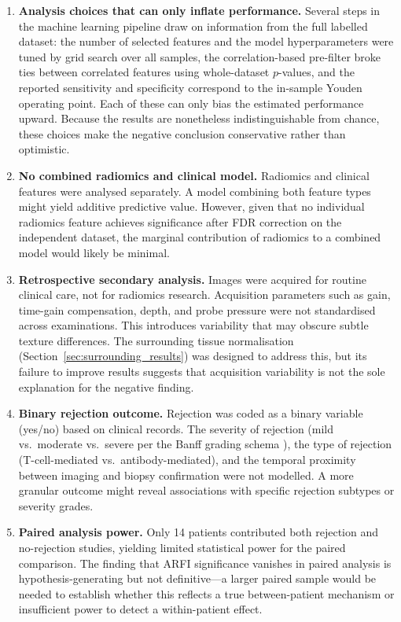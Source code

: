 \begin{enumerate}
\item \textbf{Analysis choices that can only inflate performance.} Several steps in the machine learning pipeline draw on information from the full labelled dataset: the number of selected features and the model hyperparameters were tuned by grid search over all samples, the correlation-based pre-filter broke ties between correlated features using whole-dataset $p$-values, and the reported sensitivity and specificity correspond to the in-sample Youden operating point. Each of these can only bias the estimated performance upward. Because the results are nonetheless indistinguishable from chance, these choices make the negative conclusion conservative rather than optimistic.

\item \textbf{No combined radiomics and clinical model.} Radiomics and clinical features were analysed separately. A model combining both feature types might yield additive predictive value. However, given that no individual radiomics feature achieves significance after FDR correction on the independent dataset, the marginal contribution of radiomics to a combined model would likely be minimal.

\item \textbf{Retrospective secondary analysis.} Images were acquired for routine clinical care, not for radiomics research. Acquisition parameters such as gain, time-gain compensation, depth, and probe pressure were not standardised across examinations. This introduces variability that may obscure subtle texture differences. The surrounding tissue normalisation (Section~\ref{sec:surrounding_results}) was designed to address this, but its failure to improve results suggests that acquisition variability is not the sole explanation for the negative finding.

\item \textbf{Binary rejection outcome.} Rejection was coded as a binary variable (yes/no) based on clinical records. The severity of rejection (mild vs.\ moderate vs.\ severe per the Banff grading schema \cite{drachenberg2008}), the type of rejection (T-cell-mediated vs.\ antibody-mediated), and the temporal proximity between imaging and biopsy confirmation were not modelled. A more granular outcome might reveal associations with specific rejection subtypes or severity grades.

\item \textbf{Paired analysis power.} Only 14 patients contributed both rejection and no-rejection studies, yielding limited statistical power for the paired comparison. The finding that ARFI significance vanishes in paired analysis is hypothesis-generating but not definitive---a larger paired sample would be needed to establish whether this reflects a true between-patient mechanism or insufficient power to detect a within-patient effect.

\end{enumerate}


